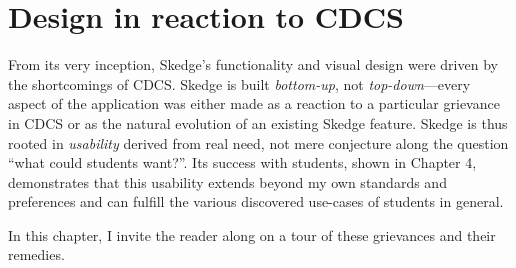 
\chapter{Design in reaction to CDCS}

From its very inception, Skedge's functionality and visual design were driven by the shortcomings of CDCS. Skedge is built \emph{bottom-up}, not \emph{top-down}---every aspect of the application was either made as a reaction to a particular grievance in CDCS or as the natural evolution of an existing Skedge feature. Skedge is thus rooted in \emph{usability} derived from real need, not mere conjecture along the question ``what could students want?''. Its success with students, shown in Chapter 4, demonstrates that this usability extends beyond my own standards and preferences and can fulfill the various discovered use-cases of students in general.

In this chapter, I invite the reader along on a tour of these grievances and their remedies.



\clearpage



\clearpage



\clearpage


